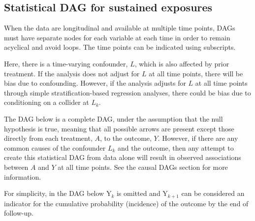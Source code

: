 \documentclass[a4paper]{report}
\begin{document}
\vspace{3mm}

\subsection{Statistical DAG for sustained exposures}

When the data are longitudinal and available at multiple time points, DAGs must have separate nodes for each variable at each time in order to remain acyclical and avoid loops. The time points can be indicated using subscripts. 

Here, there is a time-varying confounder, $L$, which is also affected by prior treatment. If the analysis does not adjust for $L$ at all time points, there will be bias due to confounding. However, if the analysis adjusts for $L$ at all time points through simple stratification-based regression analyses, there could be bias due to conditioning on a collider at $L_k$.

The DAG below is a complete DAG, under the assumption that the null hypothesis is true, meaning that all possible arrows are present except those directly from each treatment, $A$, to the outcome, $Y$. However, if there are any common causes of the confounder $L_k$ and the outcome, then any attempt to create this statistical DAG from data alone will result in observed associations between $A$ and $Y$ at all time points. See the causal DAGs section for more information.

For simplicity, in the DAG below Y$_k$ is omitted and Y$_{k+1}$ can be considered an indicator for the cumulative probability (incidence) of the outcome by the end of follow-up.

\vspace{3mm}
\end{document}
